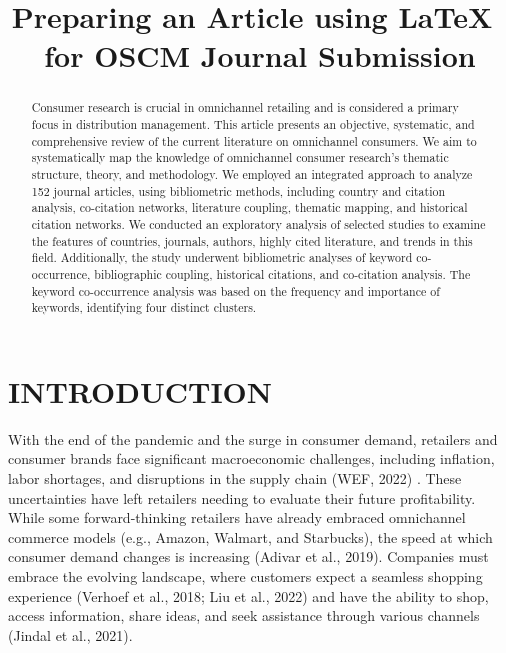 \documentclass[preprint]{oscmjournal}
\title{Preparing an Article using \LaTeX~ for OSCM Journal Submission}
\begin{document}
\maketitle

\begin{abstract}
    Consumer research is crucial in omnichannel retailing and is considered a primary focus in distribution management. This article presents an objective, systematic, and comprehensive review of the current literature on omnichannel consumers. We aim to systematically map the knowledge of omnichannel consumer research's thematic structure, theory, and methodology. We employed an integrated approach to analyze 152 journal articles, using bibliometric methods, including country and citation analysis, co-citation networks, literature coupling, thematic mapping, and historical citation networks. We conducted an exploratory analysis of selected studies to examine the features of countries, journals, authors, highly cited literature, and trends in this field. Additionally, the study underwent bibliometric analyses of keyword co-occurrence, bibliographic coupling, historical citations, and co-citation analysis. The keyword co-occurrence analysis was based on the frequency and importance of keywords, identifying four distinct clusters. 
\end{abstract}


\section{INTRODUCTION}

With the end of the pandemic and the surge in consumer demand, retailers and consumer brands face significant macroeconomic challenges, including inflation, labor shortages, and disruptions in the supply chain (WEF, 2022) \autocite{queiroz2023metaverse}. These uncertainties have left retailers needing to evaluate their future profitability. While some forward-thinking retailers have already embraced omnichannel commerce models (e.g., Amazon, Walmart, and Starbucks), the speed at which consumer demand changes is increasing (Adivar et al., 2019). Companies must embrace the evolving landscape, where customers expect a seamless shopping experience (Verhoef et al., 2018; Liu et al., 2022) and have the ability to shop, access information, share ideas, and seek assistance through various channels (Jindal et al., 2021).
\end{document}
